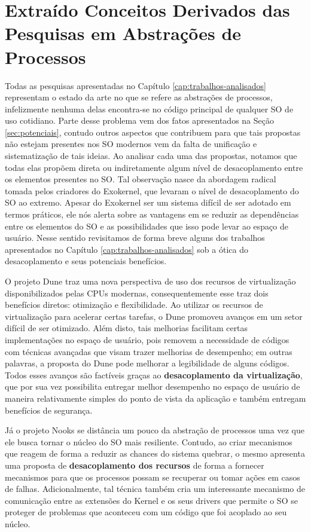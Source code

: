 

\section{Extraído Conceitos Derivados das Pesquisas em Abstrações de Processos}

Todas as pesquisas apresentadas no Capítulo \ref{cap:trabalhos-analisados}
representam o estado da arte no que se refere as abstrações de processos,
infelizmente nenhuma delas encontra-se no código principal de qualquer SO de
uso cotidiano. Parte desse problema vem dos fatos apresentados na Seção
\ref{sec:potenciais}, contudo outros aspectos que contribuem para que tais
propostas não estejam presentes nos SO modernos vem da falta de unificação e
sistematização de tais ideias. Ao analisar cada uma das propostas, notamos que
todas elas propõem direta ou indiretamente algum nível de desacoplamento entre
os elementos presentes no SO. Tal observação nasce da abordagem radical tomada
pelos criadores do Exokernel, que levaram o nível de desacoplamento do SO ao
extremo. Apesar do Exokernel ser um sistema difícil de ser adotado em termos
práticos, ele nós alerta sobre as vantagens em se reduzir as dependências
entre os elementos do SO e as possibilidades que isso pode levar ao espaço de
usuário. Nesse sentido revisitamos de forma breve alguns dos trabalhos
apresentados no Capítulo \ref{cap:trabalhos-analisados} sob a ótica do
desacoplamento e seus potenciais benefícios.

O projeto Dune traz uma nova perspectiva de uso dos recursos de virtualização
disponibilizados pelas CPUs modernas, consequentemente esse traz dois
benefícios diretos: otimização e flexibilidade. Ao utilizar os recursos de
virtualização para acelerar certas tarefas, o Dune promoveu avanços em um setor
difícil de ser otimizado. Além disto, tais melhorias facilitam certas
implementações no espaço de usuário, pois removem a necessidade de códigos com
técnicas avançadas que visam trazer melhorias de desempenho; em outras
palavras, a proposta do Dune pode melhorar a legibilidade de alguns códigos.
Todos esses avanços são factíveis graças ao \textbf{desacoplamento da
virtualização}, que por sua vez possibilita entregar melhor desempenho no
espaço de usuário de maneira relativamente simples do ponto de vista da
aplicação e também entregam benefícios de segurança.

Já o projeto Nooks se distância um pouco da abstração de processos uma vez que
ele busca tornar o núcleo do SO mais resiliente. Contudo, ao criar mecanismos
que reagem de forma a reduzir as chances do sistema quebrar, o mesmo apresenta
uma proposta de \textbf{desacoplamento dos recursos} de forma a fornecer
mecanismos para que os processos possam se recuperar ou tomar ações em casos de
falhas.  Adicionalmente, tal técnica também cria um interessante mecanismo de
comunicação entre as extensões do Kernel e os seus drivers que permite o SO se
proteger de problemas que aconteceu com um código que foi acoplado ao seu
núcleo.

